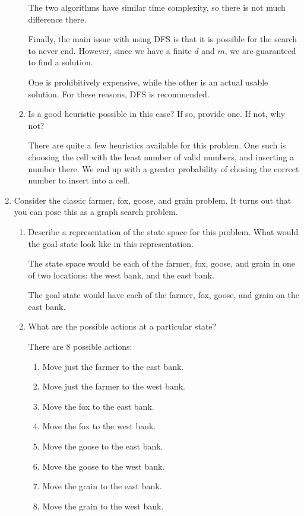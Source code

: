 \documentclass[12pt,letterpaper]{article}
\begin{document}
\begin{enumerate}
\begin{enumerate}
          The two algorithms have similar time complexity, so there is not much difference there.

          Finally, the main issue with using DFS is that it is possible for the search to never end.
          However, since we have a finite $d$ and $m$, we are guaranteed to find a solution.

          One is prohibitively expensive, while the other is an actual usable solution.
          For these reasons, DFS is recommended.
        \item
          Is a good heuristic possible in this case?
          If so, provide one. If not, why not?

          There are quite a few heuristics available for this problem.
          One such is choosing the cell with the least number of valid numbers,
          and inserting a number there.
          We end up with a greater probability of chosing the correct number to insert into a cell.
      \end{enumerate}

    \pagebreak

    \item
      Consider the classic farmer, fox, goose, and grain problem.
      It turns out that you can pose this as a graph search problem.
      \begin{enumerate}
        \item
          Describe a representation of the state space for this problem.
          What would the goal state look like in this representation.

          The state space would be each of the farmer, fox, goose, and grain
          in one of two locations: the west bank, and the east bank.

          The goal state would have each of the farmer, fox, goose, and grain
          on the east bank.
        \item
          What are the possible actions at a particular state?

          There are 8 possible actions:
          \begin{enumerate}
            \item Move just the farmer to the east bank.
            \item Move just the farmer to the west bank.
            \item Move the fox to the east bank.
            \item Move the fox to the west bank.
            \item Move the goose to the east bank.
            \item Move the goose to the west bank.
            \item Move the grain to the east bank.
            \item Move the grain to the west bank.
          \end{enumerate}


\end{enumerate}
\end{enumerate}
\end{document}
